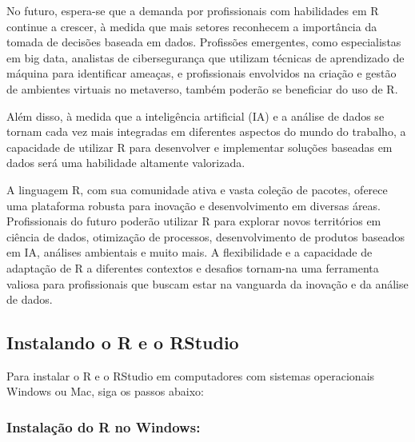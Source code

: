 \documentclass[
]{book}
\begin{document}
No futuro, espera-se que a demanda por profissionais com habilidades em R continue a crescer, à medida que mais setores reconhecem a importância da tomada de decisões baseada em dados. Profissões emergentes, como especialistas em big data, analistas de cibersegurança que utilizam técnicas de aprendizado de máquina para identificar ameaças, e profissionais envolvidos na criação e gestão de ambientes virtuais no metaverso, também poderão se beneficiar do uso de R.

Além disso, à medida que a inteligência artificial (IA) e a análise de dados se tornam cada vez mais integradas em diferentes aspectos do mundo do trabalho, a capacidade de utilizar R para desenvolver e implementar soluções baseadas em dados será uma habilidade altamente valorizada.

A linguagem R, com sua comunidade ativa e vasta coleção de pacotes, oferece uma plataforma robusta para inovação e desenvolvimento em diversas áreas. Profissionais do futuro poderão utilizar R para explorar novos territórios em ciência de dados, otimização de processos, desenvolvimento de produtos baseados em IA, análises ambientais e muito mais. A flexibilidade e a capacidade de adaptação de R a diferentes contextos e desafios tornam-na uma ferramenta valiosa para profissionais que buscam estar na vanguarda da inovação e da análise de dados.

\subsection{\texorpdfstring{\textbf{Instalando o R e o RStudio}~}{Instalando o R e o RStudio~}}\label{instalando-o-r-e-o-rstudio}

Para instalar o R e o RStudio em computadores com sistemas operacionais Windows ou Mac, siga os passos abaixo:~~

\subsubsection{Instalação do R no Windows:~}\label{instalauxe7uxe3o-do-r-no-windows}
\end{document}
